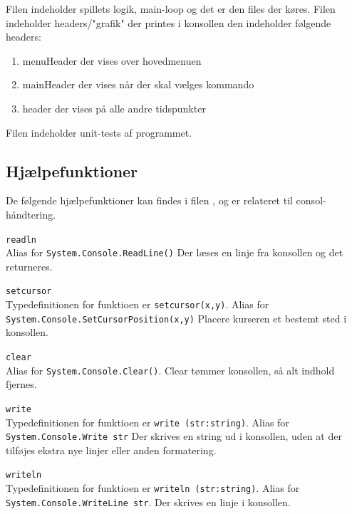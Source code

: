 \documentclass[a4paper]{article}
\begin{document}
    Filen  indeholder spillets logik, main-loop og det er den files der køres.
    Filen  indeholder headers/"grafik" der printes i konsollen den indeholder følgende headers:
    \begin{enumerate}
      \item menuHeader der vises over hovedmenuen
      \item mainHeader der vises når der skal vælges kommando
      \item header der vises på alle andre tidspunkter
    \end{enumerate}
    Filen  indeholder unit-tests af programmet.


    

    \subsection{Hjælpefunktioner} \label{ssec:helpers}
      De følgende hjælpefunktioner kan findes i filen , og er relateret til consol-håndtering.
      \begin{description}
      
        \item{\texttt{readln}}~\\
          Alias for \lstinline$System.Console.ReadLine()$
          Der læses en linje fra konsollen og det returneres.

        \item{\texttt{setcursor}}~\\
          Typedefinitionen for funktioen er \lstinline$setcursor(x,y)$.
          Alias for \lstinline$System.Console.SetCursorPosition(x,y)$
          Placere kurseren et bestemt sted i konsollen.

        \item{\texttt{clear}}~\\
          Alias for \lstinline$System.Console.Clear()$.
          Clear tømmer konsollen, så alt indhold fjernes.

        \item{\texttt{write}}~\\
          Typedefinitionen for funktioen er \lstinline$write (str:string)$.
          Alias for \lstinline$System.Console.Write str$
          Der skrives en string ud i konsollen, uden at der tilføjes ekstra nye linjer eller anden formatering.

        \item{\texttt{writeln}}~\\
          Typedefinitionen for funktioen er \lstinline$writeln (str:string)$.
          Alias for \lstinline$System.Console.WriteLine str$.
          Der skrives en linje i konsollen.
      \end{description}~\\
      
\end{document}
